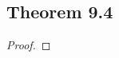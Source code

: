 \documentclass[../../main.tex]{subfiles}
\begin{document}
\subsection{Theorem 9.4}
\begin{wts}

\end{wts}
\begin{proof}

\end{proof}
\end{document}
